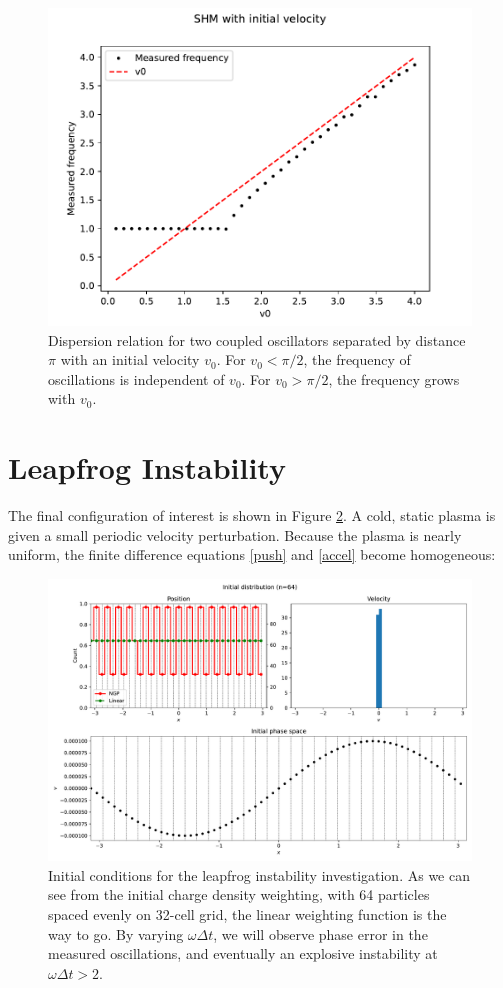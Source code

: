 \documentclass[%
 reprint,
 amsmath,amssymb,
 aps,
]{revtex4-2}
\begin{document}
\begin{figure}
\includegraphics[width=0.9\linewidth]{proj2/coupled_oscillators_dispersion.pdf}
\caption{\label{fig:two-particle-moving-dispersion}Dispersion relation for two coupled oscillators separated by distance $\pi$ with an initial velocity $v_0$. For $v_0 < \pi / 2$, the frequency of oscillations is independent of $v_0$. For $v_0 > \pi / 2$, the frequency grows with $v_0$.}
\end{figure}

\section{Leapfrog Instability}

The final configuration of interest is shown in Figure \ref{fig:leapfrog-init}. A cold, static plasma is given a small periodic velocity perturbation. Because the plasma is nearly uniform, the finite difference equations \eqref{push} and \eqref{accel} become homogeneous:

\begin{figure}[h]
\includegraphics[width=0.9\linewidth]{proj2/leapfrog-instability-setup.pdf}
\caption{\label{fig:leapfrog-init}Initial conditions for the leapfrog instability investigation. As we can see from the initial charge density weighting, with 64 particles spaced evenly on 32-cell grid, the linear weighting function is the way to go. By varying $\omega \Delta t$, we will observe phase error in the measured oscillations, and eventually an explosive instability at $\omega \Delta t > 2$.}
\end{figure}
\end{document}
